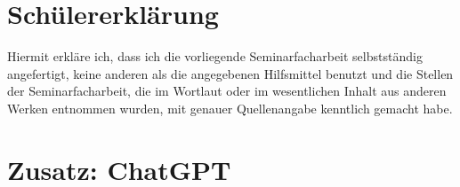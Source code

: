 \documentclass[11pt]{article}
\begin{document}
\section{Schülererklärung}
Hiermit erkläre ich, dass ich die vorliegende Seminarfacharbeit selbstständig angefertigt,
keine anderen als die angegebenen Hilfsmittel benutzt und die Stellen der Seminarfacharbeit,
die im Wortlaut oder im wesentlichen Inhalt aus anderen Werken entnommen wurden,
mit genauer Quellenangabe kenntlich gemacht habe.

\section{Zusatz: ChatGPT}
\end{document}
